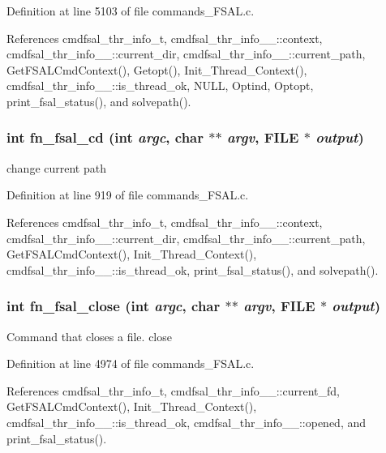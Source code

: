 Definition at line 5103 of file commands\_\-FSAL.c.

References cmdfsal\_\-thr\_\-info\_\-t, cmdfsal\_\-thr\_\-info\_\-\_\-::context, cmdfsal\_\-thr\_\-info\_\-\_\-::current\_\-dir, cmdfsal\_\-thr\_\-info\_\-\_\-::current\_\-path, Get\-FSALCmd\-Context(), Getopt(), Init\_\-Thread\_\-Context(), cmdfsal\_\-thr\_\-info\_\-\_\-::is\_\-thread\_\-ok, NULL, Optind, Optopt, print\_\-fsal\_\-status(), and solvepath().
\subsubsection{\setlength{\rightskip}{0pt plus 5cm}int fn\_\-fsal\_\-cd (int {\em argc}, char $\ast$$\ast$ {\em argv}, FILE $\ast$ {\em output})}\label{commands__FSAL_8c_a20}


change current path 

Definition at line 919 of file commands\_\-FSAL.c.

References cmdfsal\_\-thr\_\-info\_\-t, cmdfsal\_\-thr\_\-info\_\-\_\-::context, cmdfsal\_\-thr\_\-info\_\-\_\-::current\_\-dir, cmdfsal\_\-thr\_\-info\_\-\_\-::current\_\-path, Get\-FSALCmd\-Context(), Init\_\-Thread\_\-Context(), cmdfsal\_\-thr\_\-info\_\-\_\-::is\_\-thread\_\-ok, print\_\-fsal\_\-status(), and solvepath().
\subsubsection{\setlength{\rightskip}{0pt plus 5cm}int fn\_\-fsal\_\-close (int {\em argc}, char $\ast$$\ast$ {\em argv}, FILE $\ast$ {\em output})}\label{commands__FSAL_8c_a41}


Command that closes a file. close 

Definition at line 4974 of file commands\_\-FSAL.c.

References cmdfsal\_\-thr\_\-info\_\-t, cmdfsal\_\-thr\_\-info\_\-\_\-::current\_\-fd, Get\-FSALCmd\-Context(), Init\_\-Thread\_\-Context(), cmdfsal\_\-thr\_\-info\_\-\_\-::is\_\-thread\_\-ok, cmdfsal\_\-thr\_\-info\_\-\_\-::opened, and print\_\-fsal\_\-status().
